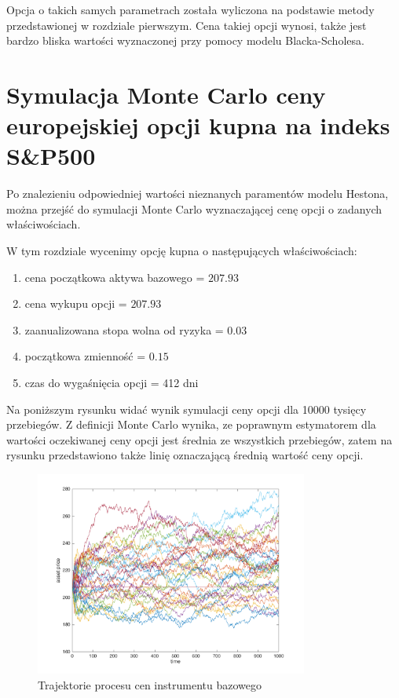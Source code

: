 \documentclass{pracamgr}
\begin{document}
Opcja o takich samych parametrach została wyliczona na podstawie metody przedstawionej w rozdziale pierwszym. Cena takiej opcji wynosi, także jest bardzo bliska wartości wyznaczonej przy pomocy modelu Blacka-Scholesa.


\section{Symulacja Monte Carlo ceny europejskiej opcji kupna na indeks S\&P500}

Po znalezieniu odpowiedniej wartości nieznanych paramentów modelu Hestona, można 
przejść do symulacji Monte Carlo wyznaczającej cenę opcji o zadanych właściwościach.

W tym rozdziale wycenimy opcję kupna o następujących właściwościach:
\begin{enumerate}
  \item cena początkowa aktywa bazowego = $207.93$
  \item cena wykupu opcji = $207.93$ 
  \item zaanualizowana stopa wolna od ryzyka = $0.03$
  \item początkowa zmienność =  $0.15$
  \item czas do wygaśnięcia opcji = 412 dni
\end{enumerate}
 
Na poniższym rysunku widać wynik symulacji ceny opcji dla 10000 tysięcy przebiegów.
Z definicji Monte Carlo wynika, ze poprawnym estymatorem dla wartości oczekiwanej ceny
opcji jest średnia ze wszystkich przebiegów, zatem na rysunku przedstawiono także linię
oznaczającą średnią wartość ceny opcji. 

\begin{figure}
\centering
  \includegraphics[width=0.80\textwidth]{../chartHeston.png}
  \caption{Trajektorie procesu cen instrumentu bazowego}
  \label{fig:hestonAssetPaths}
\end{figure}
\end{document}
